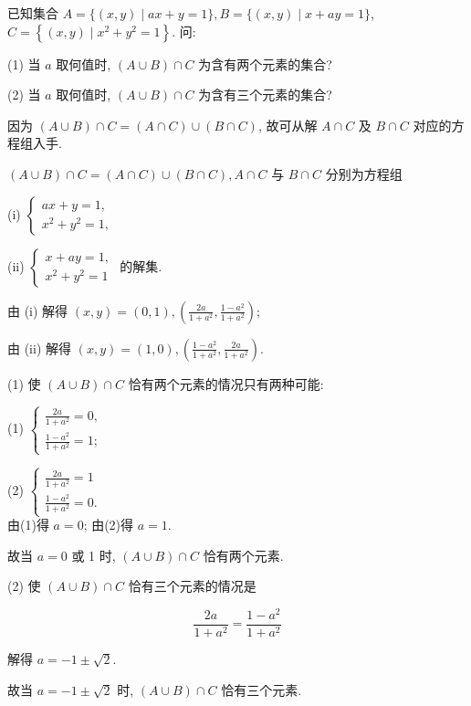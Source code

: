 \begin{example}
	已知集合 $A=\{(x, y) \mid a x+y=1\}, B=\{(x, y) \mid x+a y=1\}$, $C=\left\{(x, y) \mid x^{2}+y^{2}=1\right\}$. 问:

	(1) 当 $a$ 取何值时, $(A \cup B) \cap C$ 为含有两个元素的集合?

	(2) 当 $a$ 取何值时, $(A \cup B) \cap C$ 为含有三个元素的集合?

\end{example}

\begin{analysis}
	因为 $(A \cup B) \cap C=(A \cap C) \cup(B \cap C)$, 故可从解 $A \cap C$ 及 $B \cap C$ 对应的方程组入手.
\end{analysis}

\begin{solution}
	$(A \cup B) \cap C=(A \cap C) \cup(B \cap C), A \cap C$ 与 $B \cap C$ 分别为方程组

	(i) $\left\{\begin{array}{l}a x+y=1, \\ x^{2}+y^{2}=1,\end{array}\right.$

	(ii) $\left\{\begin{array}{l}x+a y=1, \\ x^{2}+y^{2}=1\end{array}\right.$
	的解集.

	由 (i) 解得 $(x, y)=(0,1),\left(\frac{2 a}{1+a^{2}}, \frac{1-a^{2}}{1+a^{2}}\right)$;

	由 (ii) 解得 $(x, y)=(1,0),\left(\frac{1-a^{2}}{1+a^{2}}, \frac{2 a}{1+a^{2}}\right)$.

	(1) 使 $(A \cup B) \cap C$ 恰有两个元素的情况只有两种可能:

	(1) $\left\{\begin{array}{l}\frac{2 a}{1+a^{2}}=0, \\ \frac{1-a^{2}}{1+a^{2}}=1 ;\end{array}\right.$

	(2) $\left\{\begin{array}{l}\frac{2 a}{1+a^{2}}=1 \\ \frac{1-a^{2}}{1+a^{2}}=0 .\end{array}\right.$\\
	由(1)得 $a=0$; 由(2)得 $a=1$.

	故当 $a=0$ 或 1 时, $(A \cup B) \cap C$ 恰有两个元素.

	(2) 使 $(A \cup B) \cap C$ 恰有三个元素的情况是

	$$
		\frac{2 a}{1+a^{2}}=\frac{1-a^{2}}{1+a^{2}}
	$$

	解得 $a=-1 \pm \sqrt{2}$.

	故当 $a=-1 \pm \sqrt{2}$ 时, $(A \cup B) \cap C$ 恰有三个元素.
\end{solution}

